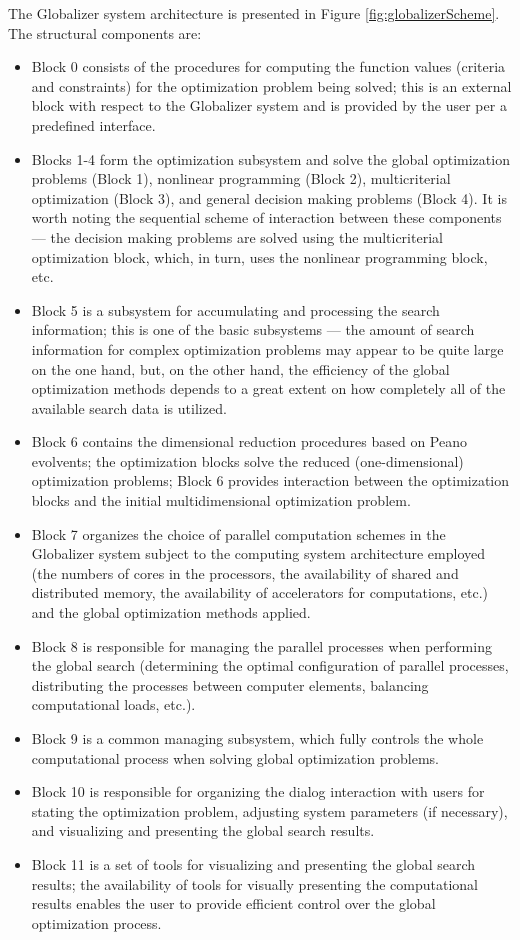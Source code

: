 \documentclass{gOMS2e}
\theoremstyle{plain}%
\theoremstyle{definition}
\theoremstyle{remark}
\begin{document}
\par
The Globalizer system architecture is presented in Figure \ref{fig:globalizerScheme}. The structural components are:
\begin{itemize}
  \item Block 0 consists of the procedures for computing the function values (criteria
  and constraints) for the optimization problem being solved; this is an external
  block with respect to the Globalizer system and is provided by the user per a predefined interface.
  \item Blocks 1-4 form the optimization subsystem and solve the global optimization
  problems (Block 1), nonlinear programming (Block 2), multicriterial optimization (Block 3),
  and general decision making problems (Block 4). It is worth noting the sequential
  scheme of interaction between these components --- the decision making problems are
  solved using the multicriterial optimization block, which, in turn, uses the nonlinear programming block, etc.
  \item Block 5 is a subsystem for accumulating and processing the search information;
  this is one of the basic subsystems --- the amount of search information for complex
  optimization problems may appear to be quite large on the one hand, but, on the other
  hand, the efficiency of the global optimization methods depends to a great extent on how
  completely all of the available search data is utilized.
  \item Block 6 contains the dimensional reduction procedures based on Peano evolvents;
  the optimization blocks solve the reduced (one-dimensional) optimization problems;
  Block 6 provides interaction between the optimization blocks and the initial
  multidimensional optimization problem.
  \item Block 7 organizes the choice of parallel computation schemes in the Globalizer
  system subject to the computing system architecture employed (the numbers of cores in the
  processors, the availability of shared and distributed memory, the availability of
  accelerators for computations, etc.) and the global optimization methods applied.
  \item Block 8 is responsible for managing the parallel processes when performing the
  global search (determining the optimal configuration of parallel processes, distributing
  the processes between computer elements, balancing computational loads, etc.).
  \item Block 9 is a common managing subsystem, which fully controls the whole
  computational process when solving global optimization problems.
  \item Block 10 is responsible for organizing the dialog interaction with users for
  stating the optimization problem, adjusting system parameters (if necessary), and
  visualizing and presenting the global search results.
  \item Block 11 is a set of tools for visualizing and presenting the global search results;
  the availability of tools for visually presenting the computational results enables
  the user to provide efficient control over the global optimization process.
\end{itemize}
\end{document}
